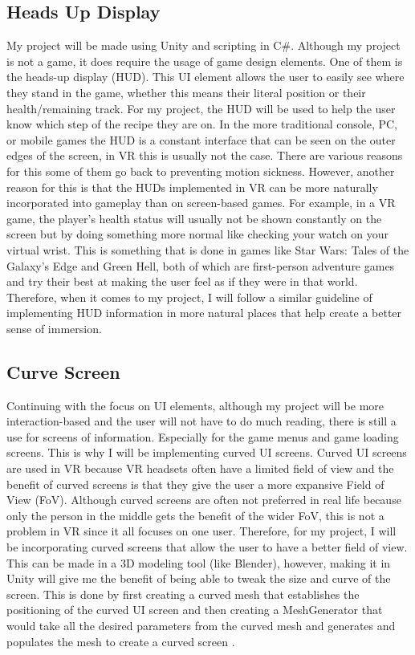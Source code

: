 \documentclass[11pt,twocolumn]{article}
\begin{document}
\subsection{Heads Up Display}
My project will be made using Unity and scripting in C\#. Although my project is not a game, it does require the usage of game design elements. One of them is the heads-up display (HUD). This UI element allows the user to easily see where they stand in the game, whether this means their literal position or their health/remaining track. For my project, the HUD will be used to help the user know which step of the recipe they are on. In the more traditional console, PC, or mobile games the HUD is a constant interface that can be seen on the outer edges of the screen, in VR this is usually not the case. There are various reasons for this some of them go back to preventing motion sickness. However, another reason for this is that the HUDs implemented in VR can be more naturally incorporated into gameplay than on screen-based games. For example, in a VR game, the player's health status will usually not be shown constantly on the screen but by doing something more normal like checking your watch on your virtual wrist. This is something that is done in games like Star Wars: Tales of the Galaxy’s Edge\cite{talesOfGlax2020} and Green Hell\cite{greenHell2019}, both of which are first-person adventure games and try their best at making the user feel as if they were in that world. Therefore, when it comes to my project, I will follow a similar guideline of implementing HUD information in more natural places that help create a better sense of immersion.

 

\subsection{Curve Screen}
Continuing with the focus on UI elements, although my project will be more interaction-based and the user will not have to do much reading, there is still a use for screens of information. Especially for the game menus and game loading screens. This is why I will be implementing curved UI screens. Curved UI screens are used in VR because VR headsets often have a limited field of view and the benefit of curved screens is that they give the user a more expansive Field of View (FoV)\cite{curvedScreen2020}. Although curved screens are often not preferred in real life because only the person in the middle gets the benefit of the wider FoV, this is not a problem in VR since it all focuses on one user. Therefore, for my project, I will be incorporating curved screens that allow the user to have a better field of view. This can be made in a 3D modeling tool (like Blender), however, making it in Unity will give me the benefit of being able to tweak the size and curve of the screen. This is done by first creating a curved mesh that establishes the positioning of the curved UI screen and then creating a MeshGenerator that would take all the desired parameters from the curved mesh and generates and populates the mesh to create a curved screen \cite{curvedScreen2020}.
\end{document}
